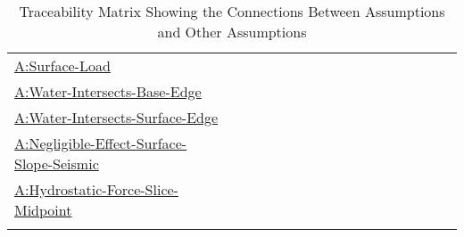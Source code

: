 \documentclass[12pt]{article}
\begin{document}
\begin{longtable}{l l l l l l l l l l l l l l l l l}
\\
\hyperref[assumpSL]{A:Surface-Load} &  &  &  &  &  &  &  &  &  &  &  &  &  &  &  & 
\\
\hyperref[assumpWIBE]{A:Water-Intersects-Base-Edge} &  &  &  &  &  &  &  &  &  &  &  &  &  &  &  & 
\\
\hyperref[assumpWISE]{A:Water-Intersects-Surface-Edge} &  &  &  &  &  &  &  &  &  &  &  &  &  &  &  & 
\\
\hyperref[assumpNESSS]{A:Negligible-Effect-Surface-Slope-Seismic} &  &  &  &  &  &  &  &  &  &  &  &  &  &  &  & 
\\
\hyperref[assumpHFSM]{A:Hydrostatic-Force-Slice-Midpoint} &  &  &  &  &  &  &  &  &  &  &  &  &  &  &  & 
\\
\bottomrule
\caption{Traceability Matrix Showing the Connections Between Assumptions and Other Assumptions}
\label{Table:TraceMatAvsA}
\end{longtable}
\end{document}
